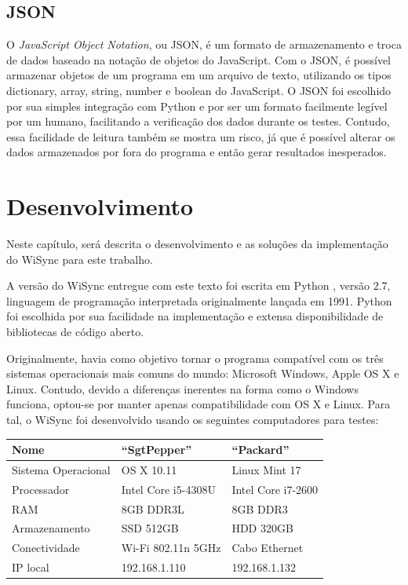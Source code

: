 \documentclass[12pt,a4paper]{ufpr}
\begin{document}
\section {JSON}
O \textit{JavaScript Object Notation}, ou JSON\cite{json}, é um formato de armazenamento e troca de dados baseado na notação de objetos do JavaScript. Com o JSON, é possível armazenar objetos de um programa em um arquivo de texto, utilizando os tipos dictionary, array, string, number e boolean do JavaScript.
O JSON foi escolhido por sua simples integração com Python e por ser um formato facilmente legível por um humano, facilitando a verificação dos dados durante os testes.
Contudo, essa facilidade de leitura também se mostra um risco, já que é possível alterar os dados armazenados por fora do programa e então gerar resultados inesperados.


\chapter{Desenvolvimento}
\label{desenvolvimento}
Neste capítulo, será descrita o desenvolvimento e as soluções da implementação do WiSync para este trabalho.

A versão do WiSync entregue com este texto foi escrita em Python \cite{python}, versão 2.7, linguagem de programação interpretada originalmente lançada em 1991.
Python foi escolhida por sua facilidade na implementação e extensa disponibilidade de bibliotecas de código aberto.

Originalmente, havia como objetivo tornar o programa compatível com os três sistemas operacionais mais comuns do mundo: Microsoft Windows, Apple OS X e Linux.
Contudo, devido a diferenças inerentes na forma como o Windows funciona, optou-se por manter apenas compatibilidade com OS X e Linux.
Para tal, o WiSync foi desenvolvido usando os seguintes computadores para testes:

\begin{center}
  \begin{tabular}{ l | l | l }
    \hline
    \textbf{Nome} & ``SgtPepper'' & ``Packard'' \\ \hline \hline
    Sistema Operacional & OS X 10.11 & Linux Mint 17 \\ \hline
    Processador & Intel Core i5-4308U & Intel Core i7-2600 \\ \hline
    RAM & 8GB DDR3L & 8GB DDR3 \\ \hline
    Armazenamento & SSD 512GB & HDD 320GB \\ \hline
    Conectividade & Wi-Fi 802.11n 5GHz & Cabo Ethernet \\ \hline
    IP local & 192.168.1.110 & 192.168.1.132 \\
    \hline
  \end{tabular}
\end{center}
\end{document}
